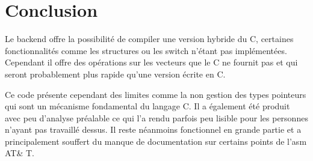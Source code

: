 \section{Conclusion}

\vspace{0.5cm}
Le backend offre la possibilité de compiler une version hybride du C, certaines fonctionnalités comme les structures ou les switch n'étant pas implémentées. Cependant il offre des opérations sur les vecteurs que le C ne fournit pas et qui seront probablement plus rapide qu'une version écrite en C. 

\vspace{0.5cm}
Ce code présente cependant des limites comme la non gestion des types pointeurs qui sont un mécanisme fondamental du langage C. Il a également été produit avec peu d'analyse préalable ce qui l'a rendu parfois peu lisible pour les personnes n'ayant pas travaillé dessus. Il reste néanmoins fonctionnel en grande partie et a principalement souffert du manque de documentation sur certains points de l'asm AT\& T. 